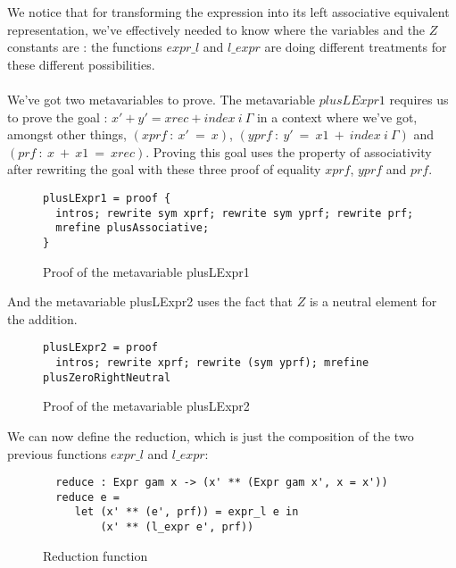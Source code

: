 We notice that for transforming the expression into its left associative equivalent representation, we've effectively needed to know where the variables and the $Z$ constants are : the functions $expr\_l$ and $l\_expr$ are doing different treatments for these different possibilities. \\
\\
We've got two metavariables to prove. The metavariable $plusLExpr1$ requires us to prove the goal : $x' + y' = xrec + index\ i\ \Gamma$ in a context where we've got, amongst other things,  $(xprf\ :\ x'\ =\ x)$, $(yprf\ :\ y'\ =\ x1\ +\ index\ i\ \Gamma)$ and $(prf\ :\ x\ +\ x1\ =\ xrec)$.
Proving this goal uses the property of associativity after rewriting the goal with these three proof of equality $xprf$, $yprf$ and $prf$.

\begin{figure}[H]
\figrule
\begin{center}
\begin{verbatim}
plusLExpr1 = proof {
  intros; rewrite sym xprf; rewrite sym yprf; rewrite prf;
  mrefine plusAssociative;
}
\end{verbatim}
\end{center}
\caption{Proof of the metavariable plusLExpr1}
\figrule
\end{figure}

And the metavariable plusLExpr2 uses the fact that $Z$ is a neutral element for the addition.

\begin{figure}[H]
\figrule
\begin{center}
\begin{verbatim}
plusLExpr2 = proof
  intros; rewrite xprf; rewrite (sym yprf); mrefine plusZeroRightNeutral
\end{verbatim}
\end{center}
\caption{Proof of the metavariable plusLExpr2}
\figrule
\end{figure}

We can now define the reduction, which is just the composition of the two previous functions $expr\_l$ and $l\_expr$:

\begin{figure}[H]
\figrule
\begin{center}
\begin{verbatim}
  reduce : Expr gam x -> (x' ** (Expr gam x', x = x'))
  reduce e = 
     let (x' ** (e', prf)) = expr_l e in
         (x' ** (l_expr e', prf))
\end{verbatim}
\end{center}
\caption{Reduction function}
\figrule
\end{figure}


